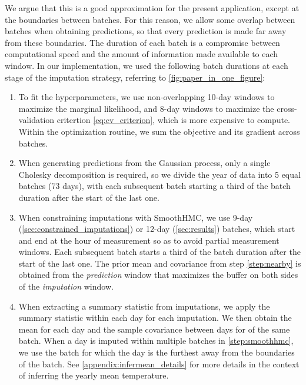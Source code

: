 We argue that this is a good approximation for the present application, except at the boundaries
between batches.
For this reason, we allow some overlap between batches when obtaining predictions,
so that every prediction is made far away from these boundaries.
The duration of each batch is a compromise between computational speed and the amount of information made
available to each window.
In our implementation, we used the following batch durations at each stage of the imputation strategy, referring to \autoref{fig:paper_in_one_figure}:
\begin{enumerate}[label=(\alph*),start=2]
    \item To fit the hyperparameters, we use non-overlapping 10-day windows to maximize the marginal likelihood,
          and 8-day windows to maximize the cross-validation critertion \autoref{eq:cv_criterion}, which
          is more expensive to compute.
          Within the optimization routine, we sum the objective and its gradient across batches.
          \label{step:hyperparameters}
    \item When generating predictions from the Gaussian process, only a single Cholesky decomposition
          is required, so we divide the year of data into 5 equal batches (73 days), with each
          subsequent batch starting a third of the batch duration after the start of the last one.
          \label{step:nearby}
    \item When constraining imputations with SmoothHMC, we use 9-day (\autoref{sec:constrained_imputations}) or 12-day (\autoref{sec:results}) batches, which start and end at the hour of measurement so as to avoid partial measurement windows.
          Each subsequent batch starts a third of the batch duration after the start of the last one.
          The prior mean and covariance from step \ref{step:nearby} is 
          obtained from the \emph{prediction} window that maximizes the buffer on both sides
          of the \emph{imputation} window.
          \label{step:smoothhmc}
    \setcounter{enumi}{5}
    \item When extracting a summary statistic from imputations, we apply the summary
          statistic within each day for each imputation.
          We then obtain the mean for each day and the sample covariance between days
          for of the same batch.
          When a day is imputed within multiple batches in \ref{step:smoothhmc}, we use the
          batch for which the day is the furthest away from the boundaries of the batch.
          See \autoref{appendix:infermean_details} for more details in the context of inferring the 
          yearly mean temperature.
\end{enumerate}

